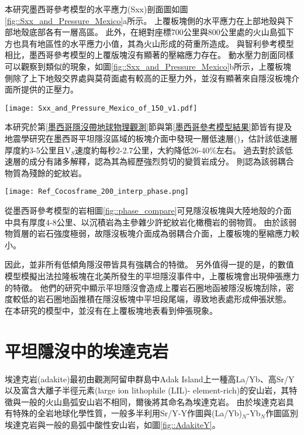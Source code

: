本研究墨西哥參考模型的水平應力(Sxx)剖面圖如圖\ref{fig::Sxx_and_Pressure_Mexico}a所示。
上覆板塊側的水平應力在上部地殼與下部地殼底部各有一層高區。
此外，在絕對座標700公里與800公里處的火山島弧下方也具有地區性的水平應力小值，其為火山形成的荷重所造成。
與智利參考模型相比，墨西哥參考模型的上覆版塊沒有顯著的壓縮應力存在。
動水壓力剖面同樣可以觀察到類似的現象，如圖\ref{fig::Sxx_and_Pressure_Mexico}b所示，上覆板塊側除了上下地殼交界處與莫荷面處有較高的正壓力外，並沒有顯著來自隱沒板塊介面所提供的正壓力。
\begin{figure*}[h]
    \centering
    \texttt{[image: Sxx\_and\_Pressure\_Mexico\_of\_150\_v1.pdf]}
    \caption[參考模型中於30 Myr的水平應力剖面]{參考模型中於30 Myr的水平應力剖面。}
    \label{fig::Sxx_and_Pressure_Mexico}
\end{figure*}

本研究於第\ref{墨西哥隱沒帶地球物理觀測}節與第\ref{墨西哥參考模型結果}節皆有提及地震學研究在墨西哥平坦隱沒區域的板塊介面中發現一層低速層(\citealp{PerezCampos2008})，\citealp{Song2009}估計該低速層厚度約3-5公里且V$_S$速度約每秒2-2.7公里，大約降低26-40$\%$左右。
過去對於該低速層的成分有諸多解釋，\citealp{Song2012SC}認為其為經歷強烈剪切的變質岩成分。
\citealp{Manea2017}則認為該弱耦合物質為殘餘的蛇紋岩。

\begin{figure*}[h]
    \centering
    \texttt{[image: Ref\_Cocosframe\_200\_interp\_phase.png]}
    \caption[墨西哥參考模型中於40 Myr於近地表100公里以上岩相剖面。]{墨西哥參考模型中於40 Myr於近地表100公里以上岩相剖面。}
    \label{fig::phase_compare}
\end{figure*}

從墨西哥參考模型的岩相圖\ref{fig::phase_compare}可見隱沒板塊與大陸地殼的介面中具有厚度4-8公里、以沉積岩為主參雜少許蛇紋岩化橄欖岩的弱物質。
由於該弱物質層的岩石強度極弱，故隱沒板塊介面成為弱耦合介面，上覆板塊的壓縮應力較小。

因此，並非所有低傾角隱沒帶皆具有強耦合的特徵。
另外值得一提的是，\citealp{axen2018basal}的數值模型模擬出法拉隆板塊在北美所發生的平坦隱沒事件中，上覆板塊會出現伸張應力的特徵。
他們的研究中顯示平坦隱沒會造成上覆岩石圈地函被隱沒板塊刮除，密度較低的岩石圈地函推積在隱沒板塊中平坦段尾端，導致地表處形成伸張狀態。
在本研究的模型中，並沒有在上覆板塊地表看到伸張現象。

\section{平坦隱沒中的埃達克岩}\label{平坦隱沒中的埃達克岩}
埃達克岩(adakite)最初由\citealp{kay1978aleutian}觀測阿留申群島中Adak Island上一種高La/Yb、高Sr/Y以及富含大離子半徑元素(large ion lithophile (LIL)- element-rich)的安山岩，其特徵與一般的火山島弧安山岩不相同，爾後\citealp{defant1990derivation}將其命名為埃達克岩。
由於埃達克岩具有特殊的全岩地球化學性質，一般多半利用Sr/Y-Y作圖與(La/Yb)$_N$-Yb$_N$作圖區別埃達克岩與一般的島弧中酸性安山岩，如圖\ref{fig::AdakiteY}。

